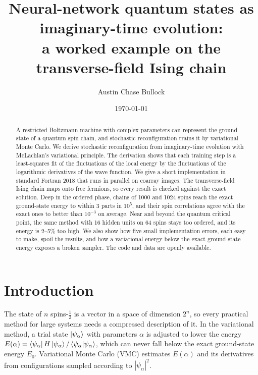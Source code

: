 \documentclass[aps,prb,preprint,amsmath,amssymb,nofootinbib,longbibliography]{revtex4-2}
\begin{document}
\title{Neural-network quantum states as imaginary-time evolution:\\ a worked example on the transverse-field Ising chain}

\ifanonymous\else
\author{Austin Chase Bullock}
\fi

\date{\today}

\begin{abstract}
A restricted Boltzmann machine with complex parameters can represent the ground state of a quantum spin chain, and
stochastic reconfiguration trains it by variational Monte Carlo. We derive stochastic reconfiguration from
imaginary-time evolution with McLachlan's variational principle. The derivation shows that each training step is a
least-squares fit of the fluctuations of the local energy by the fluctuations of the logarithmic derivatives of the
wave function. We give a short implementation in standard Fortran 2018 that runs in parallel on coarray images. The
transverse-field Ising chain maps onto free fermions, so every result is checked against the exact solution. Deep in
the ordered phase, chains of 1000 and 1024 spins reach the exact ground-state energy to within 3 parts in $10^5$,
and their spin correlations agree with the exact ones to better than $10^{-3}$ on average. Near and beyond the
quantum critical point, the same method with 16 hidden units on 64 spins stays too ordered, and its energy is 2--5\%
too high. We also show how five small implementation errors, each easy to make, spoil the results, and how a
variational energy below the exact ground-state energy exposes a broken sampler. The code and data are openly
available.
\end{abstract}

\maketitle

\section{Introduction}
\label{sec:intro}

The state of $n$ spins-$\frac12$ is a vector in a space of dimension $2^n$, so every practical method for large
systems needs a compressed description of it. In the variational method, a trial state $\ket{\psi_\alpha}$ with
parameters $\alpha$ is adjusted to lower the energy $E(\alpha) = \bra{\psi_\alpha}H\ket{\psi_\alpha} /
\braket{\psi_\alpha|\psi_\alpha}$, which can never fall below the exact ground-state energy $E_0$. Variational Monte
Carlo (VMC) estimates $E(\alpha)$ and its derivatives from configurations sampled according to
$|\psi_\alpha|^2$.\cite{becca2017}
\end{document}
